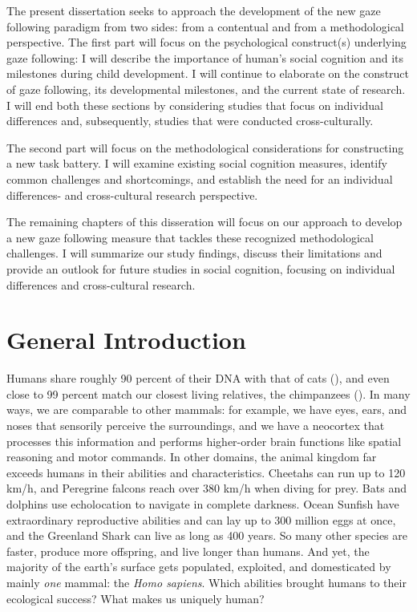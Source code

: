 \documentclass[
]{scrbook}
\begin{document}
The present dissertation seeks to approach the development of the new gaze following paradigm from two sides: from a contentual and from a methodological perspective. The first part will focus on the psychological construct(s) underlying gaze following: I will describe the importance of human's social cognition and its milestones during child development. I will continue to elaborate on the construct of gaze following, its developmental milestones, and the current state of research. I will end both these sections by considering studies that focus on individual differences and, subsequently, studies that were conducted cross-culturally.

The second part will focus on the methodological considerations for constructing a new task battery. I will examine existing social cognition measures, identify common challenges and shortcomings, and establish the need for an individual differences- and cross-cultural research perspective.

The remaining chapters of this disseration will focus on our approach to develop a new gaze following measure that tackles these recognized methodological challenges. I will summarize our study findings, discuss their limitations and provide an outlook for future studies in social cognition, focusing on individual differences and cross-cultural research.

\mainmatter

\chapter{General Introduction}\label{introduction}

Humans share roughly 90 percent of their DNA with that of cats (), and even close to 99 percent match our closest living relatives, the chimpanzees (). In many ways, we are comparable to other mammals: for example, we have eyes, ears, and noses that sensorily perceive the surroundings, and we have a neocortex that processes this information and performs higher-order brain functions like spatial reasoning and motor commands. In other domains, the animal kingdom far exceeds humans in their abilities and characteristics. Cheetahs can run up to 120 km/h, and Peregrine falcons reach over 380 km/h when diving for prey. Bats and dolphins use echolocation to navigate in complete darkness. Ocean Sunfish have extraordinary reproductive abilities and can lay up to 300 million eggs at once, and the Greenland Shark can live as long as 400 years. So many other species are faster, produce more offspring, and live longer than humans. And yet, the majority of the earth's surface gets populated, exploited, and domesticated by mainly \emph{one} mammal: the \emph{Homo sapiens}. Which abilities brought humans to their ecological success? What makes us uniquely human?
\end{document}
